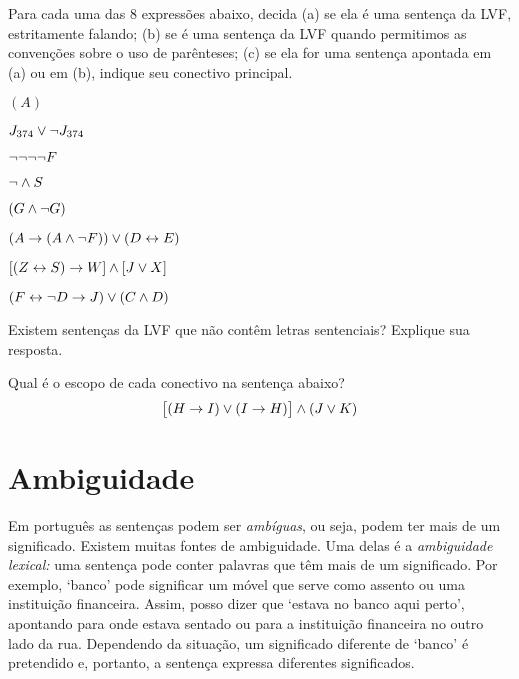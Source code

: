 \solutions
\problempart
\label{pr.wiffTFL}
Para cada uma das $8$ expressões abaixo, decida (a) se ela é uma sentença da LVF, estritamente falando; (b) se é uma sentença da LVF quando permitimos as convenções sobre o uso de parênteses; (c) se ela for uma sentença apontada em (a) ou em (b), indique seu conectivo principal.
\begin{earg}
\item $(A)$
\item $J_{374} \vee \neg J_{374}$
\item $\neg \neg \neg \neg F$
\item $\neg \wedge S$
\item $(G \wedge \neg G)$
\item $(A \rightarrow (A \wedge \neg F)) \vee (D \leftrightarrow E)$
\item $[(Z \leftrightarrow S) \rightarrow W] \wedge [J \vee X]$
\item $(F \leftrightarrow \neg D \rightarrow J) \vee (C \wedge D)$
\end{earg}

\problempart
Existem sentenças da LVF que não contêm letras sentenciais? Explique sua resposta.

\problempart
Qual é o escopo de cada conectivo na sentença abaixo?
$$\bigl[(H \rightarrow I) \vee (I \rightarrow H)\bigr] \wedge (J \vee K)$$

\chapter{Ambiguidade}\label{s:AbmbiguityTFL}

Em português as sentenças podem ser \textit{ambíguas}, ou seja, podem ter mais de um significado. Existem muitas fontes de ambiguidade. Uma delas é a \emph{ambiguidade lexical:} uma sentença pode conter palavras que têm mais de um significado. Por exemplo, `banco' pode significar um móvel que serve como assento ou uma instituição financeira. Assim, posso dizer que `estava no banco aqui perto', apontando para onde estava sentado ou para a instituição financeira no outro lado da rua. Dependendo da situação, um significado diferente de `banco' é pretendido e, portanto, a sentença expressa diferentes significados.

